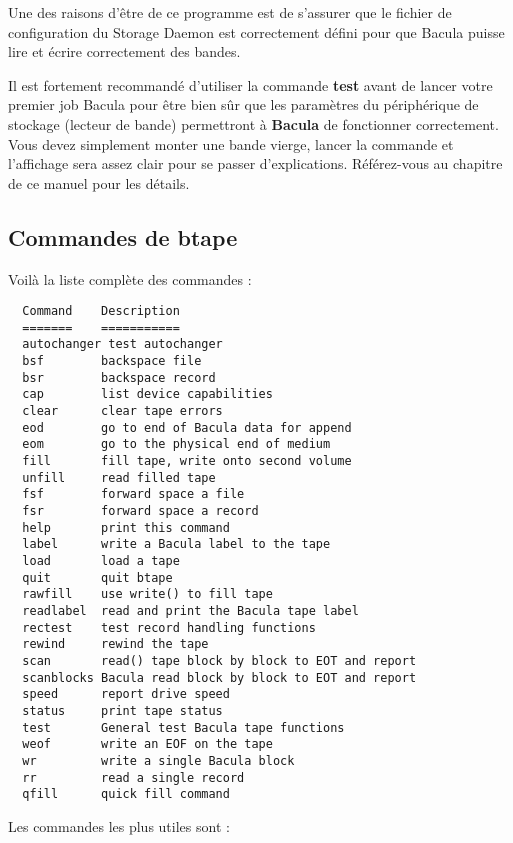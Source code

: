 Une des raisons d'être de ce programme est de s'assurer que le fichier de 
configuration du Storage Daemon est correctement défini pour que Bacula puisse
lire et écrire correctement des bandes.

Il est fortement recommandé d'utiliser la commande {\bf test} avant de lancer
votre premier job Bacula pour être bien sûr que les paramètres du périphérique
de stockage (lecteur de bande) permettront à {\bf Bacula} de fonctionner
correctement. Vous devez simplement monter une bande vierge, lancer la commande
et l'affichage sera assez clair pour se passer d'explications. Référez-vous au
chapitre  de ce manuel pour les
détails. 

\subsection{Commandes de btape}

Voilà la liste complète des commandes :

\footnotesize
\begin{verbatim}
  Command    Description
  =======    ===========
  autochanger test autochanger
  bsf        backspace file
  bsr        backspace record
  cap        list device capabilities
  clear      clear tape errors
  eod        go to end of Bacula data for append
  eom        go to the physical end of medium
  fill       fill tape, write onto second volume
  unfill     read filled tape
  fsf        forward space a file
  fsr        forward space a record
  help       print this command
  label      write a Bacula label to the tape
  load       load a tape
  quit       quit btape
  rawfill    use write() to fill tape
  readlabel  read and print the Bacula tape label
  rectest    test record handling functions
  rewind     rewind the tape
  scan       read() tape block by block to EOT and report
  scanblocks Bacula read block by block to EOT and report
  speed      report drive speed
  status     print tape status
  test       General test Bacula tape functions
  weof       write an EOF on the tape
  wr         write a single Bacula block
  rr         read a single record
  qfill      quick fill command
\end{verbatim}
\normalsize

Les commandes les plus utiles sont :


